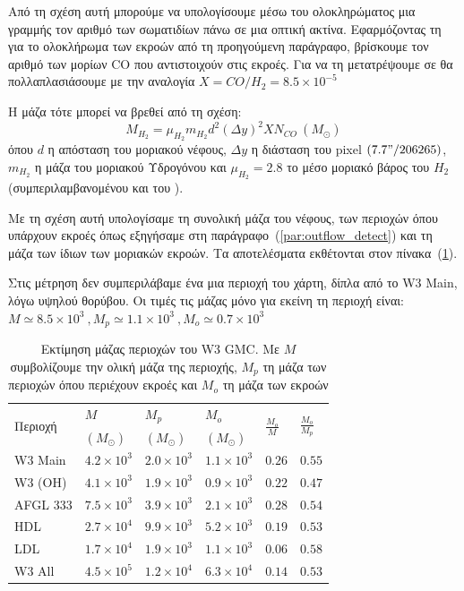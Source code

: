 \documentclass[a4paper,12pt]{memoir}
\newcommand{\e}[1]{\times 10^{#1}}
\begin{document}
Από τη σχέση αυτή μπορούμε να υπολογίσουμε μέσω του ολοκληρώματος μια γραμμής τον αριθμό των σωματιδίων πάνω σε μια οπτική ακτίνα. Εφαρμόζοντας τη για το ολοκλήρωμα των εκροών από τη προηγούμενη παράγραφο, βρίσκουμε τον αριθμό των μορίων CO που αντιστοιχούν στις εκροές. Για να τη μετατρέψουμε σε  θα πολλαπλασιάσουμε με την αναλογία $X=CO/H_2=8.5\e{-5}$ \cite{Frerking_1989}

Η μάζα τότε μπορεί να βρεθεί από τη σχέση:
\begin{equation}
M_{H_2}=\mu _{H_2} m_{H_2} d^2 (\Delta y )^2 X N_{CO} \ \left(M_{\odot} \right) 
\end{equation}
όπου $d$ η απόσταση του μοριακού νέφους, $\Delta y$ η διάσταση του pixel $(7.7"/206265)$, $m_{H_2}$ η μάζα του μοριακού Υδρογόνου και $\mu _{H_2}=2.8$ το μέσο μοριακό βάρος του $H_2$ (συμπεριλαμβανομένου και του ).

Με τη σχέση αυτή υπολογίσαμε τη συνολική μάζα του νέφους, των περιοχών όπου υπάρχουν εκροές όπως εξηγήσαμε στη παράγραφο~(\ref{par:outflow_detect}) και τη μάζα των ίδιων των μοριακών εκροών. Τα αποτελέσματα εκθέτονται στον πίνακα~(\ref{tab:masses}).

Στις μέτρηση δεν συμπεριλάβαμε ένα μια περιοχή του χάρτη, δίπλα από το W3 Main, λόγω υψηλού θορύβου. Οι τιμές τις μάζας μόνο για εκείνη τη περιοχή είναι: $M\simeq 8.5\e{3}\ ,M_p\simeq 1.1\e{3}\ ,M_o\simeq 0.7\e{3}$

\begin{table}
	\centering
	\caption{Εκτίμηση μάζας περιοχών του W3 GMC. Με $M$ συμβολίζουμε την ολική μάζα της περιοχής, $M_p$ τη μάζα των περιοχών όπου περιέχουν εκροές και $M_o$ τη μάζα των εκροών}
	\label{tab:masses}
	\begin{tabular}{p{} p{3cm} p{3cm} p{2cm} p{2cm} p{2cm}}
		\toprule
		\multirow{2}{*}{Περιοχή} & $M$ & $M_p$& $M_o$ & \multirow{2}{*}{$\frac{M_o}{M}$} & \multirow{2}{*}{$\frac{M_o}{M_p}$}\\ 
		& $(M_{\odot})$  & $(M_{\odot})$  & $(M_{\odot})$  \\
		\midrule
		W3 Main & $4.2\e{3}$ & $2.0\e{3}$ & $1.1\e{3}$ & $0.26$ & $0.55$ \\
		W3 (OH) & $4.1\e{3}$ & $1.9\e{3}$ & $0.9\e{3}$ & $0.22$ & $0.47$ \\
		AFGL 333 & $7.5\e{3}$ & $3.9\e{3}$ & $2.1\e{3}$ & $0.28$ & $0.54$ \\
		\midrule
		HDL & $2.7\e{4}$ & $9.9\e{3}$ & $5.2\e{3}$ & $0.19$ & $0.53$ \\
		LDL & $1.7\e{4}$ & $1.9\e{3}$ & $1.1\e{3}$ & $0.06$& $0.58$ \\
		\midrule
		W3 All & $4.5\e{5}$ & $1.2\e{4}$ & $6.3\e{4}$ & $0.14$ & $0.53$ \\
		\bottomrule		
	\end{tabular}
\end{table}
\end{document}

